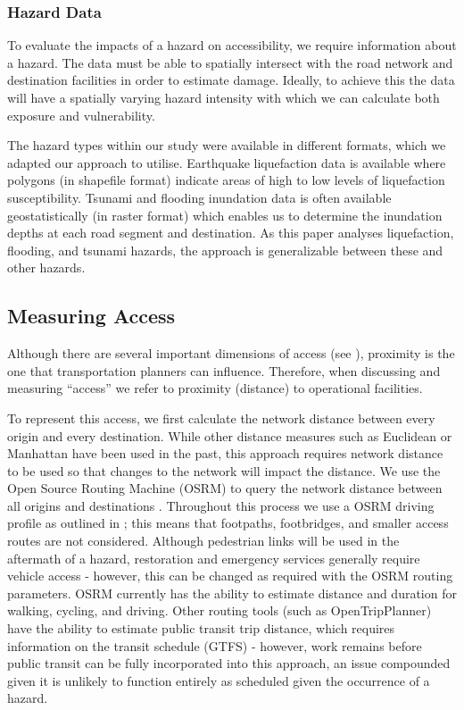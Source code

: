 \documentclass[review,3p,times,onecolumn,sort&compress,12pt]{elsarticle}
\let \cite \parencite
\begin{document}
\subsubsection{Hazard Data}
To evaluate the impacts of a hazard on accessibility, we require information about a hazard. 
The data must be able to spatially intersect with the road network and destination facilities in order to estimate damage.
Ideally, to achieve this the data will have a spatially varying hazard intensity with which we can calculate both exposure and vulnerability.

The hazard types within our study were available in different formats, which we adapted our approach to utilise.
Earthquake liquefaction data is available where polygons (in shapefile format) indicate areas of high to low levels of liquefaction susceptibility. 
Tsunami and flooding inundation data is often available geostatistically (in raster format) which enables us to determine the inundation depths at each road segment and destination.
As this paper analyses liquefaction, flooding, and tsunami hazards, the approach is generalizable between these and other hazards.

\subsection{Measuring Access}
Although there are several important dimensions of access (see \textcite{Penchansky1981-qh, Saurman2016-gj}), proximity is the one that transportation planners can influence. 
Therefore, when discussing and measuring ``access'' we refer to proximity (distance) to operational facilities. 

To represent this access, we first calculate the network distance between every origin and every destination.
While other distance measures such as Euclidean or Manhattan have been used in the past, this approach requires network distance to be used so that changes to the network will impact the distance.
We use the Open Source Routing Machine (OSRM) to query the network distance between all origins and destinations \cite{luxen-vetter-2011}. 
Throughout this process we use a OSRM driving profile as outlined in \cite{logan2019evaluating}; this means that footpaths, footbridges, and smaller access routes are not considered.
Although pedestrian links will be used in the aftermath of a hazard, restoration and emergency services generally require vehicle access - however, this can be changed as required with the OSRM routing parameters.
OSRM currently has the ability to estimate distance and duration for walking, cycling, and driving.
Other routing tools (such as OpenTripPlanner) have the ability to estimate public transit trip distance, which requires information on the transit schedule (GTFS) - however, work remains before public transit can be fully incorporated into this approach, an issue compounded given it is unlikely to function entirely as scheduled given the occurrence of a hazard.
\end{document}
